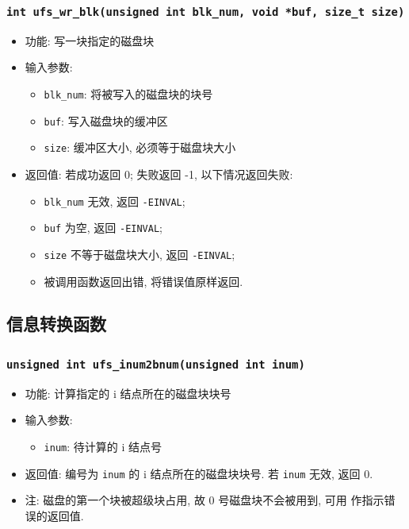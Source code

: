 \documentclass[nofonts, titlepage]{ctexart}
\begin{document}
  \subsubsection[\texttt{ufs\_wr\_blk}]{\texttt{int ufs\_wr\_blk(unsigned int blk\_num, void *buf, size\_t size)}}
  \begin{itemize}
\item
  功能: 写一块指定的磁盘块
\item
  输入参数:

  \begin{itemize}
  \item
    \texttt{blk\_num}: 将被写入的磁盘块的块号
  \item
    \texttt{buf}: 写入磁盘块的缓冲区
  \item
    \texttt{size}: 缓冲区大小, 必须等于磁盘块大小
  \end{itemize}
\item
  返回值: 若成功返回 0; 失败返回 -1, 以下情况返回失败:

  \begin{itemize}
  \item
    \texttt{blk\_num} 无效, 返回 \texttt{-EINVAL};
  \item
    \texttt{buf} 为空, 返回 \texttt{-EINVAL};
  \item
    \texttt{size} 不等于磁盘块大小, 返回 \texttt{-EINVAL};
  \item
    被调用函数返回出错, 将错误值原样返回.
  \end{itemize}
  \end{itemize}

  \subsection{信息转换函数}
  \subsubsection[\texttt{ufs\_inum2bnum}]{\texttt{unsigned int ufs\_inum2bnum(unsigned int inum)}}
  \begin{itemize}
\item
  功能: 计算指定的 i 结点所在的磁盘块块号
\item
  输入参数:

  \begin{itemize}
  \item
    \texttt{inum}: 待计算的 i 结点号
  \end{itemize}
\item
  返回值: 编号为 \texttt{inum} 的 i 结点所在的磁盘块块号. 若
  \texttt{inum} 无效, 返回 0.
\item
  注: 磁盘的第一个块被超级块占用, 故 0 号磁盘块不会被用到, 可用
  作指示错误的返回值.
  \end{itemize}
\end{document}
